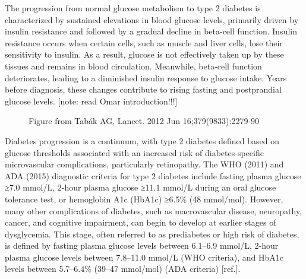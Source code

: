 \documentclass[
  a4paper,
  headsepline=true,
  open=any]{scrbook}
\begin{document}
The progression from normal glucose metabolism to type 2 diabetes is
characterized by sustained elevations in blood glucose levels, primarily
driven by insulin resistance and followed by a gradual decline in
beta-cell function. Insulin resistance occurs when certain cells, such
as muscle and liver cells, lose their sensitivity to insulin. As a
result, glucose is not effectively taken up by these tissues and remains
in blood circulation. Meanwhile, beta-cell function deteriorates,
leading to a diminished insulin response to glucose intake. Years before
diagnosis, these changes contribute to rising fasting and postprandial
glucose levels. {[}note: read Omar introduction!!!{]}

\begin{figure}

\begin{minipage}[t]{\linewidth}

{\centering 


\caption{Figure from Tabák AG, Lancet. 2012 Jun 16;379(9833):2279-90}

}

\end{minipage}%

\end{figure}

Diabetes progression is a continuum, with type 2 diabetes defined based
on glucose thresholds associated with an increased risk of
diabetes-specific microvascular complications, particularly retinopathy.
The WHO (2011) and ADA (2015) diagnostic criteria for type 2 diabetes
include fasting plasma glucose ≥7.0 mmol/L, 2-hour plasma glucose ≥11.1
mmol/L during an oral glucose tolerance test, or hemoglobin A1c (HbA1c)
≥6.5\% (48 mmol/mol). However, many other complications of diabetes,
such as macrovascular disease, neuropathy, cancer, and cognitive
impairment, can begin to develop at earlier stages of dysglycemia. This
stage, often referred to as prediabetes or high risk of diabetes, is
defined by fasting plasma glucose levels between 6.1--6.9 mmol/L, 2-hour
plasma glucose levels between 7.8--11.0 mmol/L (WHO criteria), and HbA1c
levels between 5.7--6.4\% (39--47 mmol/mol) (ADA criteria) {[}ref.{]}.
\end{document}
